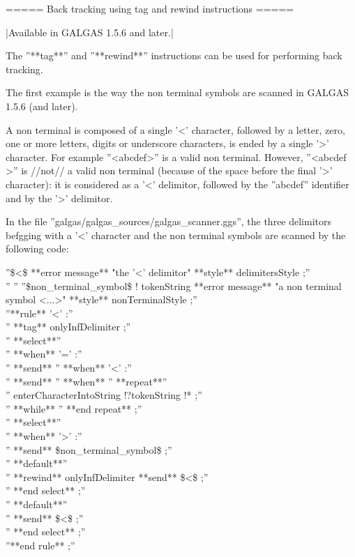 ===== Back tracking using tag and rewind instructions =====

|Available in GALGAS 1.5.6 and later.|

The ''**tag**'' and ''**rewind**'' instructions can be used for performing back tracking.

The first example is the way the non terminal symbols are scanned in GALGAS 1.5.6 (and later).

A non terminal is composed of a single '<' character, followed by a letter, zero, one or more letters, digits or underscore characters, is ended by a single '>' character. For example ''<abcdef>'' is a valid non terminal. However, ''<abcdef >'' is //not// a valid non terminal (because of the space before the final '>' character): it is considered as a '<' delimitor, followed by the ''abcdef'' identifier and by the '>' delimitor.

In the file ''galgas/galgas\_sources/galgas\_scanner.ggs'', the three delimitors befgging with a '<' character and the non terminal symbols are scanned by the following code:

''\$<\$ **error message** "the '<' delimitor" **style** delimitersStyle ;''\\
''%
''%
''\$non\_terminal\_symbol\$ ! tokenString **error message** "a non terminal symbol <...>" **style** nonTerminalStyle ;''\\

''**rule** '<' :''\\
'' **tag** onlyInfDelimiter ;''\\
'' **select**''\\
'' **when** '=' :''\\
'' **send** %
'' **when** '<' :''\\
''  **send** %
'' **when** %
''  **repeat**''\\
''   enterCharacterIntoString !?tokenString !* ;''\\
''  **while** %
''  **end repeat** ;''\\
''  **select**''\\
''  **when** '>' :''\\
''   **send** \$non\_terminal\_symbol\$ ;''\\
''  **default**''\\
''   **rewind** onlyInfDelimiter **send** \$<\$ ;''\\
''  **end select** ;''\\
'' **default**''\\
''  **send** \$<\$ ;''\\
'' **end select** ;''\\
''**end rule** ;''\\

